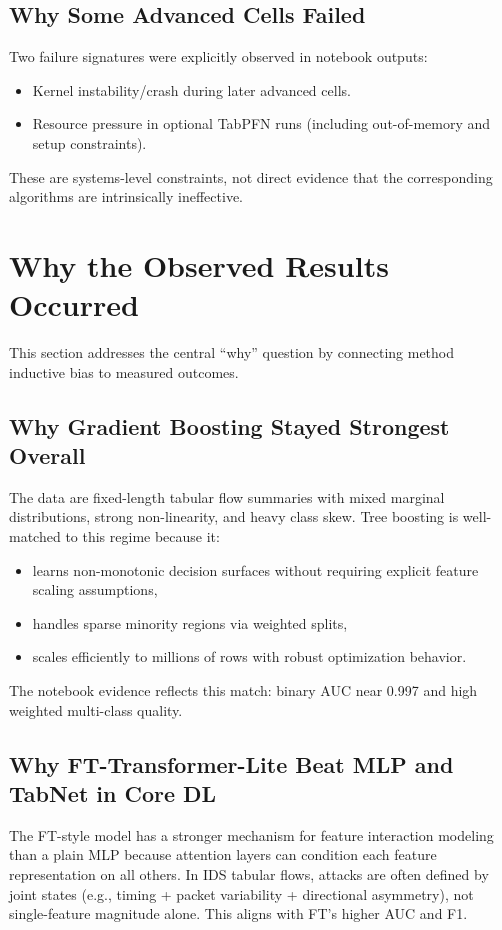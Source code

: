\documentclass[10pt,journal]{IEEEtran}
\begin{document}
\subsection{Why Some Advanced Cells Failed}
Two failure signatures were explicitly observed in notebook outputs:
\begin{itemize}
\item Kernel instability/crash during later advanced cells.
\item Resource pressure in optional TabPFN runs (including out-of-memory and setup constraints).
\end{itemize}

These are systems-level constraints, not direct evidence that the corresponding algorithms are intrinsically ineffective.

\section{Why the Observed Results Occurred}
This section addresses the central ``why'' question by connecting method inductive bias to measured outcomes.

\subsection{Why Gradient Boosting Stayed Strongest Overall}
The data are fixed-length tabular flow summaries with mixed marginal distributions, strong non-linearity, and heavy class skew. Tree boosting is well-matched to this regime because it:

\begin{itemize}
\item learns non-monotonic decision surfaces without requiring explicit feature scaling assumptions,
\item handles sparse minority regions via weighted splits,
\item scales efficiently to millions of rows with robust optimization behavior.
\end{itemize}

The notebook evidence reflects this match: binary AUC near 0.997 and high weighted multi-class quality.

\subsection{Why FT-Transformer-Lite Beat MLP and TabNet in Core DL}
The FT-style model has a stronger mechanism for feature interaction modeling than a plain MLP because attention layers can condition each feature representation on all others. In IDS tabular flows, attacks are often defined by joint states (e.g., timing + packet variability + directional asymmetry), not single-feature magnitude alone. This aligns with FT's higher AUC and F1.
\end{document}
